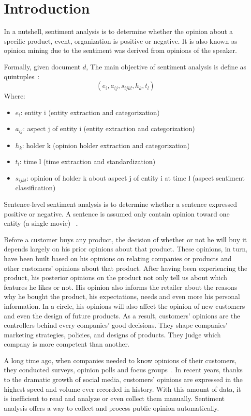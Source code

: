\section{Introduction}
In a nutshell, sentiment analysis is to determine whether the opinion about a specific product, event, organization is positive or negative. It is also known as opinion mining due to the sentiment was derived from opinions of the speaker.

Formally, given document $d$, The main objective of sentiment analysis is define as quintuples~\cite{liu2012sentiment}:
\[ ( e_{i}, a_{ij}, s_{ijkl}, h_{k}, t_{l} ) \]
Where:
\begin{itemize}
	\item $e_{i}$: entity i (entity extraction and categorization)
	\item $a_{ij}$: aspect j of entity i (entity extraction and categorization)
	\item $h_{k}$: holder k (opinion holder extraction and categorization)
	\item $t_{l}$: time l (time extraction and standardization)
	\item $s_{ijkl}$: opinion of holder k about aspect j of entity i at time l (aspect sentiment classification)
\end{itemize}
Sentence-level sentiment analysis is to determine whether a sentence expressed positive or negative. 
A sentence is assumed only contain opinion toward one entity (a single movie) ~\cite{liu2012sentiment}.

Before a customer buys any product, the decision of whether or not he will buy it depends largely on his prior opinions about that product.
These opinions, in turn, have been built based on his opinions on relating companies or products and other customers' opinions about that product.
After having been experiencing the product, his posterior opinions on the product not only tell us about which features he likes or not.
His opinion also informs the retailer about the reasons why he bought the product, his expectations, needs and even more his personal information.
In a circle, his opinions will also affect the opinion of new customers and even the design of future products.
As a result, customers' opinions are the controllers behind every companies' good decisions.
They shape companies' marketing strategies, policies, and designs of products.
They judge which company is more competent than another.

A long time ago, when companies needed to know opinions of their customers, they conducted surveys, opinion polls and focus groups~\cite{liu2012sentiment}.
In recent years, thanks to the dramatic growth of social media, customers' opinions are expressed in the highest speed and volume ever recorded in history.
With this amount of data, it is inefficient to read and analyze or even collect them manually. Sentiment analysis offers a way to collect and process public opinion automatically.

